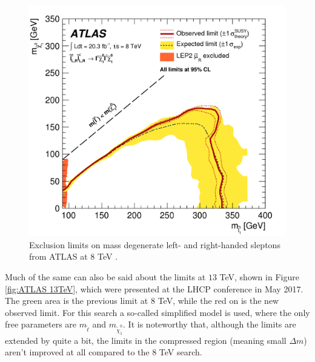 \documentclass[twocolumn,a4paper,10pt]{article}
\begin{document}
\begin{figure}
\begin{center}
\includegraphics[scale=0.1]{Run1exclusion.png}
\caption{Exclusion limits on mass degenerate left- and right-handed sleptons from ATLAS at 
$8$ TeV \cite{ATLAS:2014}.}
\label{fig:ATLAS 8TeV}
\end{center}
\end{figure}  

Much of the same can also be said about the limits at $13$ TeV, shown in Figure \ref{fig:ATLAS 13TeV}, 
which were presented at the LHCP conference in May 2017. The green area is the previous limit at $8$ 
TeV, while the red on is the new observed limit. For this search a so-called simplified model is used, 
where the only free parameters are $m_{\tilde{\ell}}$ and $m_{\tilde{\chi}_1^0}$. It is noteworthy 
that, although the limits are extended by quite a bit, the limits in the compressed region (meaning 
small $\Delta m$) aren't improved at all compared to the $8$ TeV search.        
\end{document}
